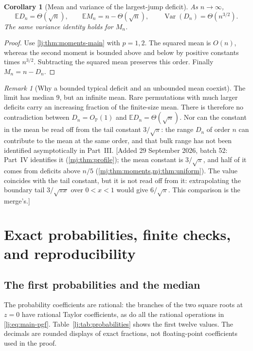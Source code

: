 \documentclass[11pt,a4paper]{article}
\newtheorem{corollary}[corollary]{Corollary}
\theoremstyle{definition}\newaliascnt{definition}{theorem}
\theoremstyle{remark}\newaliascnt{remark}{theorem}
\newtheorem{remark}[remark]{Remark}
\newcommand{\ljP}{\mathbb P}
\newcommand{\ljE}{\mathbb E}
\begin{document}
\begin{corollary}[Mean and variance of the largest-jump deficit]
\label{lj:cor:mean-var}
As $n\to\infty$,
\begin{equation}
 \ljE D_n=\Theta(\sqrt n),\qquad
 \ljE M_n=n-\Theta(\sqrt n),\qquad
 \operatorname{Var}(D_n)=\Theta(n^{3/2}).
 \label{lj:eq:mean-variance-cor}
\end{equation}
The same variance identity holds for $M_n$.
\end{corollary}
\begin{proof}
Use \cref{lj:thm:moments-main} with $p=1,2$. The squared mean is $O(n)$,
whereas the second moment is bounded above and below by positive
constants times $n^{3/2}$. Subtracting the squared mean preserves this
order. Finally $M_n=n-D_n$.
\end{proof}

\begin{remark}[Why a bounded typical deficit and an unbounded mean coexist]
The limit has median $9$, but an infinite mean. Rare permutations with
much larger deficits carry an increasing fraction of the finite-size
mean. There is therefore no contradiction between $D_n=O_{\ljP}(1)$ and
$\ljE D_n=\Theta(\sqrt n)$. Nor can the constant in the mean be read off
from the tail constant $3/\sqrt\pi$: the range $D_n$ of order $n$ can
contribute to the mean at the same order, and that bulk range has not been
identified asymptotically in Part~III.
[Added 29 September 2026, batch 52: Part~IV identifies it
(\cref{mj:thm:profile}); the mean constant is $3/\sqrt\pi$, and half of it
comes from deficits above $n/5$ (\cref{mj:thm:moments,mj:thm:uniform}). The
value coincides with the tail constant, but it is not read off from it:
extrapolating the boundary tail $3/\sqrt{\pi x}$ over $0<x<1$ would give
$6/\sqrt\pi$. This comparison is the merge's.]
\end{remark}

\section{Exact probabilities, finite checks, and reproducibility}
\label{lj:sec:checks}

\subsection{The first probabilities and the median}
The probability coefficients are rational: the branches of the two
square roots at $z=0$ have rational Taylor coefficients, as do all the
rational operations in \eqref{lj:eq:main-pgf}. Table~\ref{lj:tab:probabilities}
shows the first twelve values. The decimals are rounded displays of
exact fractions, not floating-point coefficients used in the proof.
\end{document}
